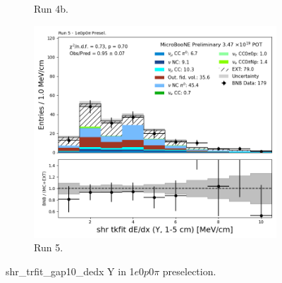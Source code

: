 \begin{figure}[H]
\begin{subfigure}[t]{0.32\linewidth}
        \caption{Run 4b.}
    \end{subfigure}%
    \hspace{0.2cm}%
    \begin{subfigure}[t]{0.32\linewidth}
        \includegraphics[width=\linewidth]{technote/Appendix_Preselection/Figures/1e0p0pi/Run5/shr_tkfit_gap10_dedx_Y_Run5_1e0p0pi_Presel.png}
        \caption{Run 5.}
    \end{subfigure}
    \caption{shr\_trfit\_gap10\_dedx Y in 1$e$0$p$0$\pi$ preselection.}
\end{figure}

